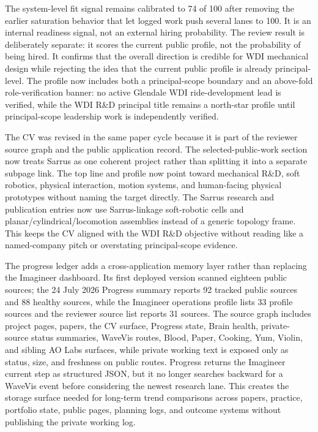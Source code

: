 \documentclass[12pt,letterpaper]{article}
\begin{document}
The system-level fit signal remains calibrated to 74 of 100 after removing the earlier saturation behavior that let logged work push several lanes to 100. It is an internal readiness signal, not an external hiring probability. The review result is deliberately separate: it scores the current public profile, not the probability of being hired. It confirms that the overall direction is credible for WDI mechanical design while rejecting the idea that the current public profile is already principal-level. The profile now includes both a principal-scope boundary and an above-fold role-verification banner: no active Glendale WDI ride-development lead is verified, while the WDI R\&D principal title remains a north-star profile until principal-scope leadership work is independently verified.

The CV was revised in the same paper cycle because it is part of the reviewer source graph and the public application record. The selected-public-work section now treats Sarrus as one coherent project rather than splitting it into a separate subpage link. The top line and profile now point toward mechanical R\&D, soft robotics, physical interaction, motion systems, and human-facing physical prototypes without naming the target directly. The Sarrus research and publication entries now use Sarrus-linkage soft-robotic cells and planar/cylindrical/locomotion assemblies instead of a generic topology frame. This keeps the CV aligned with the WDI R\&D objective without reading like a named-company pitch or overstating principal-scope evidence.

The progress ledger adds a cross-application memory layer rather than replacing the Imagineer dashboard. Its first deployed version scanned eighteen public sources; the 24 July 2026 Progress summary reports 92 tracked public sources and 88 healthy sources, while the Imagineer operations profile lists 33 profile sources and the reviewer source list reports 31 sources. The source graph includes project pages, papers, the CV surface, Progress state, Brain health, private-source status summaries, WaveVis routes, Blood, Paper, Cooking, Yum, Violin, and sibling AO Labs surfaces, while private working text is exposed only as status, size, and freshness on public routes. Progress returns the Imagineer current step as structured JSON, but it no longer searches backward for a WaveVis event before considering the newest research lane. This creates the storage surface needed for long-term trend comparisons across papers, practice, portfolio state, public pages, planning logs, and outcome systems without publishing the private working log.
\end{document}
